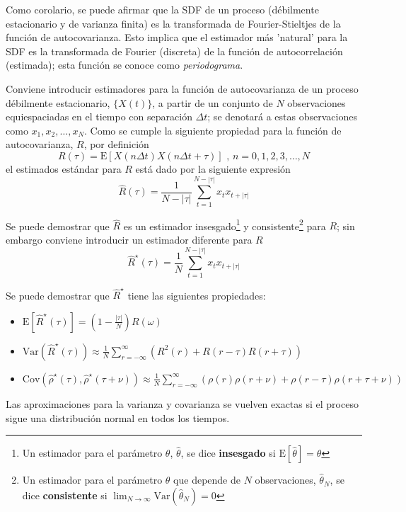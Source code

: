 \documentclass[12pt,a4paper]{mitthesis}
\newcommand{\aste}[1]{\widehat{ #1 }^{\star}}
\newcommand{\E}[1]{\mathrm{E}\left[ #1 \right]}
\newcommand{\Var}[1]{\mathrm{Var}\left( #1 \right)}
\newcommand{\Cov}[1]{\mathrm{Cov}\left( #1 \right)}
\newcommand{\abso}[1]{\left| #1 \right|}
\begin{document}
Como corolario, se puede afirmar que la SDF de un proceso (d\'ebilmente estacionario y de varianza
finita) es la transformada de Fourier-Stieltjes de la funci\'on de autocovarianza.
Esto implica que el estimador m\'as 'natural' para la SDF es la transformada de Fourier (discreta) 
de la funci\'on de autocorrelaci\'on (estimada); esta funci\'on se conoce como 
\textit{periodograma}. 

Conviene introducir estimadores para la funci\'on de autocovarianza de un proceso d\'ebilmente 
estacionario, $\{ X(t) \}$, a partir de un conjunto de $N$ observaciones equiespaciadas en el 
tiempo con separaci\'on $\Delta t$; se denotar\'a a estas observaciones como 
$x_1, x_2 , \dots, x_N$. Como se cumple la siguiente propiedad para la funci\'on de autocovarianza, 
$R$, por definici\'on
\begin{equation*}
R(\tau) = \E{X(n\Delta t)X(n\Delta t + \tau)} \text{  ,  } n = 0, 1, 2,  3,\dots, N
\end{equation*}
el estimados est\'andar para $R$ est\'a dado por la siguiente expresi\'on
\begin{equation*}
\widehat{R}(\tau) = \frac{1}{N-\abso{\tau}} 
\sum_{t = 1}^{N-\abso{\tau}} x_t x_{t+\abso{\tau}}
\label{estimador_R}
\end{equation*}

Se puede demostrar que $\widehat{R}$ es un estimador insesgado\footnote{Un estimador para el 
par\'ametro $\theta$, $\widehat{\theta}$, se dice \textbf{insesgado} si 
$\E{\widehat{\theta}}=\theta$} y consistente\footnote{Un estimador para el par\'ametro $\theta$ que 
depende de $N$ observaciones, 
$\widehat{\theta}_N$, se dice \textbf{consistente} si 
$\lim_{N\rightarrow \infty} \Var{\widehat{\theta}_N} = 0$} 
para $R$; sin embargo conviene introducir un estimador diferente para $R$
\begin{equation*}
\aste{R}(\tau) = \frac{1}{N} 
\sum_{t = 1}^{N-\abso{\tau}} x_t x_{t+\abso{\tau}}
\label{estimador_R_ast}
\end{equation*}

Se puede demostrar que $\aste{R}$ tiene las siguientes propiedades:
\begin{itemize}
\item $\E{\aste{R}(\tau)} = \left(1 - \frac{\abso{\tau}}{N} \right) R(\omega)$
\item $\Var{\aste{R}(\tau)} \approx \frac{1}{N} 
\sum_{r=-\infty}^{\infty} \left( R^{2}(r) + R(r-\tau)R(r+\tau) \right)$
\item $\Cov{\aste{\rho}(\tau),\aste{\rho}(\tau+\nu)} \approx \frac{1}{N} 
\sum_{r=-\infty}^{\infty} \left( \rho(r)\rho(r+\nu) + \rho(r-\tau)\rho(r+\tau+\nu) \right)$
\end{itemize}
Las aproximaciones para la varianza y covarianza se vuelven exactas si el proceso sigue una 
distribuci\'on normal en todos los tiempos.
\end{document}
